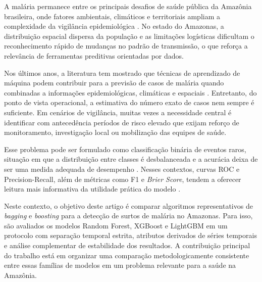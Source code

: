 
A mal\'aria permanece entre os principais desafios de sa\'ude p\'ublica da Amaz\^onia brasileira, onde fatores ambientais, clim\'aticos e territoriais ampliam a complexidade da vigil\^ancia epidemiol\'ogica \cite{arisco2025impact}. No estado do Amazonas, a distribui\c{c}\~ao espacial dispersa da popula\c{c}\~ao e as limita\c{c}\~oes log\'isticas dificultam o reconhecimento r\'apido de mudan\c{c}as no padr\~ao de transmiss\~ao, o que refor\c{c}a a relev\^ancia de ferramentas preditivas orientadas por dados.

Nos \'ultimos anos, a literatura tem mostrado que t\'ecnicas de aprendizado de m\'aquina podem contribuir para a previs\~ao de casos de mal\'aria quando combinadas a informa\c{c}\~oes epidemiol\'ogicas, clim\'aticas e espaciais \cite{monteiro2025integrating}. Entretanto, do ponto de vista operacional, a estimativa do n\'umero exato de casos nem sempre \'e suficiente. Em cen\'arios de vigil\^ancia, muitas vezes a necessidade central \'e identificar com anteced\^encia per\'iodos de risco elevado que exijam refor\c{c}o de monitoramento, investiga\c{c}\~ao local ou mobiliza\c{c}\~ao das equipes de sa\'ude.

Esse problema pode ser formulado como classifica\c{c}\~ao bin\'aria de eventos raros, situa\c{c}\~ao em que a distribui\c{c}\~ao entre classes \'e desbalanceada e a acur\'acia deixa de ser uma medida adequada de desempenho \cite{5128907}. Nesses contextos, curvas ROC e Precision-Recall, al\'em de m\'etricas como F1 e \textit{Brier Score}, tendem a oferecer leitura mais informativa da utilidade pr\'atica do modelo \cite{saito2015precision,davis2006relationship}.

Neste contexto, o objetivo deste artigo \'e comparar algoritmos representativos de \textit{bagging} e \textit{boosting} para a detec\c{c}\~ao de surtos de mal\'aria no Amazonas. Para isso, s\~ao avaliados os modelos Random Forest, XGBoost e LightGBM em um protocolo com separa\c{c}\~ao temporal estrita, atributos derivados de s\'eries temporais e an\'alise complementar de estabilidade dos resultados. A contribui\c{c}\~ao principal do trabalho est\'a em organizar uma compara\c{c}\~ao metodologicamente consistente entre essas fam\'ilias de modelos em um problema relevante para a sa\'ude na Amaz\^onia.
